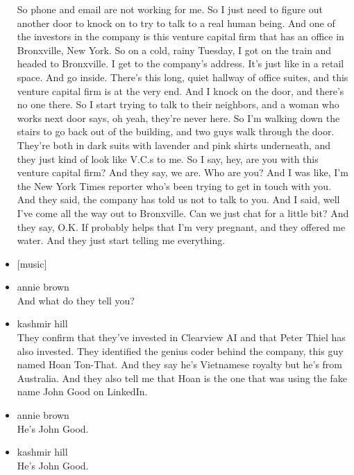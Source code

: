 \begin{itemize}
  So phone and email are not working for me. So I just need to figure
  out another door to knock on to try to talk to a real human being. And
  one of the investors in the company is this venture capital firm that
  has an office in Bronxville, New York. So on a cold, rainy Tuesday, I
  got on the train and headed to Bronxville. I get to the company's
  address. It's just like in a retail space. And go inside. There's this
  long, quiet hallway of office suites, and this venture capital firm is
  at the very end. And I knock on the door, and there's no one there. So
  I start trying to talk to their neighbors, and a woman who works next
  door says, oh yeah, they're never here. So I'm walking down the stairs
  to go back out of the building, and two guys walk through the door.
  They're both in dark suits with lavender and pink shirts underneath,
  and they just kind of look like V.C.s to me. So I say, hey, are you
  with this venture capital firm? And they say, we are. Who are you? And
  I was like, I'm the New York Times reporter who's been trying to get
  in touch with you. And they said, the company has told us not to talk
  to you. And I said, well I've come all the way out to Bronxville. Can
  we just chat for a little bit? And they say, O.K. If probably helps
  that I'm very pregnant, and they offered me water. And they just start
  telling me everything.
\item
  {[}music{]}
\item
  annie brown\\
  And what do they tell you?
\item
  kashmir hill\\
  They confirm that they've invested in Clearview AI and that Peter
  Thiel has also invested. They identified the genius coder behind the
  company, this guy named Hoan Ton-That. And they say he's Vietnamese
  royalty but he's from Australia. And they also tell me that Hoan is
  the one that was using the fake name John Good on LinkedIn.
\item
  annie brown\\
  He's John Good.
\item
  kashmir hill\\
  He's John Good.


\end{itemize}

